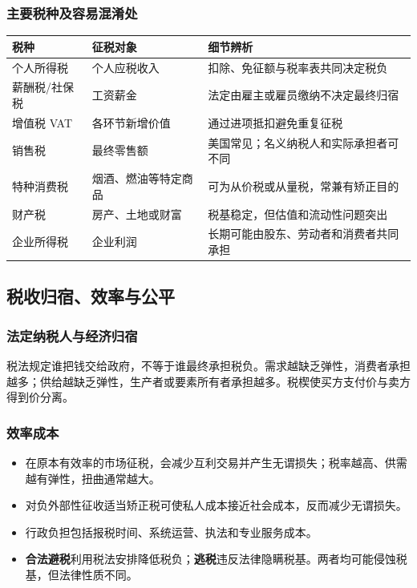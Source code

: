 \documentclass[UTF8,11pt,a4paper]{ctexart}
\newcommand{\term}[1]{\textbf{#1}}
\begin{document}
\subsubsection{主要税种及容易混淆处}
\begin{longtable}{p{}p{}p{}}
\toprule
税种 & 征税对象 & 细节辨析\\
\midrule
个人所得税 & 个人应税收入 & 扣除、免征额与税率表共同决定税负\\
薪酬税/社保税 & 工资薪金 & 法定由雇主或雇员缴纳不决定最终归宿\\
增值税 VAT & 各环节新增价值 & 通过进项抵扣避免重复征税\\
销售税 & 最终零售额 & 美国常见；名义纳税人和实际承担者可不同\\
特种消费税 & 烟酒、燃油等特定商品 & 可为从价税或从量税，常兼有矫正目的\\
财产税 & 房产、土地或财富 & 税基稳定，但估值和流动性问题突出\\
企业所得税 & 企业利润 & 长期可能由股东、劳动者和消费者共同承担\\
\bottomrule
\end{longtable}

\subsection{税收归宿、效率与公平}
\subsubsection{法定纳税人与经济归宿}
\begin{keybox}[弹性决定归宿]
税法规定谁把钱交给政府，不等于谁最终承担税负。需求越缺乏弹性，消费者承担越多；供给越缺乏弹性，生产者或要素所有者承担越多。税楔使买方支付价与卖方得到价分离。
\end{keybox}

\subsubsection{效率成本}
\begin{itemize}
  \item 在原本有效率的市场征税，会减少互利交易并产生无谓损失；税率越高、供需越有弹性，扭曲通常越大。
  \item 对负外部性征收适当矫正税可使私人成本接近社会成本，反而减少无谓损失。
  \item 行政负担包括报税时间、系统运营、执法和专业服务成本。
  \item \term{合法避税}利用税法安排降低税负；\term{逃税}违反法律隐瞒税基。两者均可能侵蚀税基，但法律性质不同。
\end{itemize}
\end{document}
